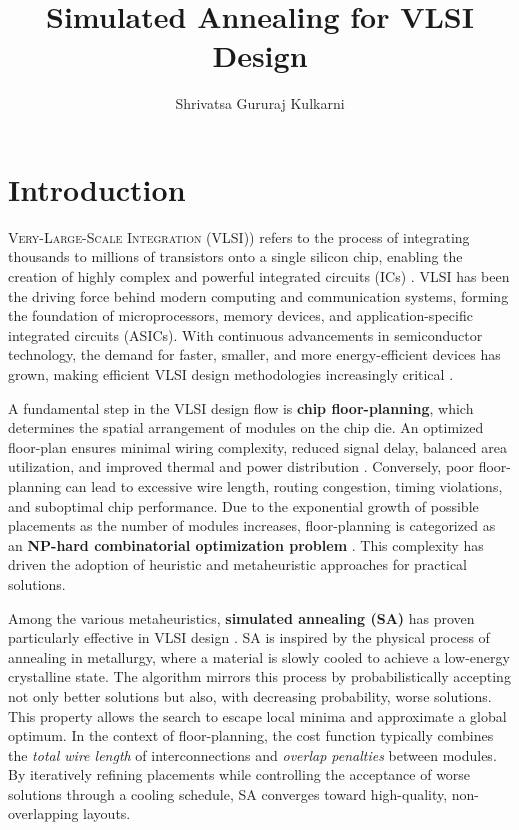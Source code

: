 \documentclass[9pt,a4paper,twoside]{rho-class/rho}
\title{Simulated Annealing for VLSI Design}
\author{Shrivatsa Gururaj Kulkarni}
\begin{document}
	
    \maketitle
    \thispagestyle{firststyle}
    \linenumbers


\section{Introduction}

\lettrine{V}{ery-Large-Scale Integration (VLSI)}) refers to the process of integrating thousands to millions of transistors onto a single silicon chip, enabling the creation of highly complex and powerful integrated circuits (ICs) \cite{Weste}. VLSI has been the driving force behind modern computing and communication systems, forming the foundation of microprocessors, memory devices, and application-specific integrated circuits (ASICs). With continuous advancements in semiconductor technology, the demand for faster, smaller, and more energy-efficient devices has grown, making efficient VLSI design methodologies increasingly critical \cite{Sangiovanni}.  

A fundamental step in the VLSI design flow is \textbf{chip floor-planning}, which determines the spatial arrangement of modules on the chip die. An optimized floor-plan ensures minimal wiring complexity, reduced signal delay, balanced area utilization, and improved thermal and power distribution \cite{Sherwani}. Conversely, poor floor-planning can lead to excessive wire length, routing congestion, timing violations, and suboptimal chip performance. Due to the exponential growth of possible placements as the number of modules increases, floor-planning is categorized as an \textbf{NP-hard combinatorial optimization problem} \cite{WongSA}. This complexity has driven the adoption of heuristic and metaheuristic approaches for practical solutions.  

Among the various metaheuristics, \textbf{simulated annealing (SA)} has proven particularly effective in VLSI design \cite{Kirkpatrick}. SA is inspired by the physical process of annealing in metallurgy, where a material is slowly cooled to achieve a low-energy crystalline state. The algorithm mirrors this process by probabilistically accepting not only better solutions but also, with decreasing probability, worse solutions. This property allows the search to escape local minima and approximate a global optimum. In the context of floor-planning, the cost function typically combines the \textit{total wire length} of interconnections and \textit{overlap penalties} between modules. By iteratively refining placements while controlling the acceptance of worse solutions through a cooling schedule, SA converges toward high-quality, non-overlapping layouts.  
\end{document}

